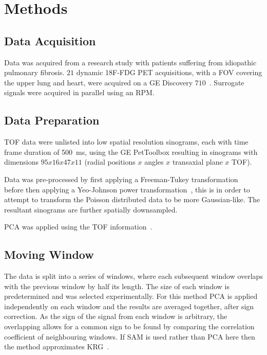\section{Methods} \label{sec:methods}
    \subsection{Data Acquisition} \label{sec:data_acquisition}
        Data was acquired from a research study with patients suffering from idiopathic pulmonary fibrosis. $21$ dynamic \acrshort{18F-FDG} \acrshort{PET} acquisitions, with a \acrlong{FOV} covering the upper lung and heart, were acquired on a \acrshort{GE} Discovery $710$~\cite{Oh2019OptimalTreatment, Emond2020EffectReconstruction}. Surrogate signals were acquired in parallel using an \gls{RPM}.
    
    \vspace{-0.3cm}
        
    \subsection{Data Preparation} \label{sec:data_preparation}
        \gls{TOF} data were unlisted into low spatial resolution sinograms, each with time frame duration of \SI{500}{\milli\second}, using the \acrshort{GE} PetToolbox resulting in sinograms with dimensions $95 x 16 x 47 x 11$ (radial positions $x$ angles $x$ transaxial plane $x$ \gls{TOF}).
        
        Data was pre-processed by first applying a Freeman-Tukey transformation~\cite{Freeman1950TransformationsRoot} before then applying a Yeo-Johnson power transformation~\cite{Yeo2000ASymmetry}, this is in order to attempt to transform the Poisson distributed data to be more Gaussian-like. The resultant sinograms are further spatially downsampled.
        
        \gls{PCA} was applied using the \gls{TOF} information~\cite{Bertolli2017DataData}.
    
    \vspace{-0.3cm}
        
    \subsection{Moving Window} \label{sec:moving_window}
        The data is split into a series of windows, where each subsequent window overlaps with the previous window by half its length. The size of each window is predetermined and was selected experimentally. For this method \gls{PCA} is applied independently on each window and the results are averaged together, after sign correction. As the sign of the signal from each window is arbitrary,  the overlapping allows for a common sign to be found by comparing the correlation coefficient of neighbouring windows. If \gls{SAM} is used rather than \gls{PCA} here then the method approximates \gls{KRG}~\cite{Schleyer2014}.
        
